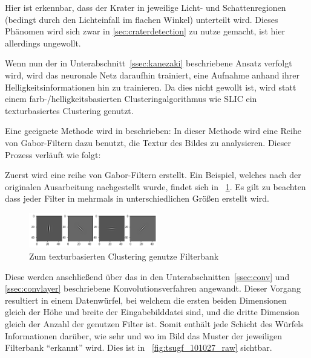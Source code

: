 Hier ist erkennbar, dass der Krater in jeweilige Licht- und Schattenregionen (bedingt durch den Lichteinfall im flachen Winkel) unterteilt wird. Dieses Phänomen wird sich zwar in \ref{sec:craterdetection} zu nutze gemacht, ist hier allerdings ungewollt.

Wenn nun der in Unterabschnitt~\ref{ssec:kanezaki} beschriebene Ansatz verfolgt wird, wird das neuronale Netz daraufhin trainiert, eine Aufnahme anhand ihrer Helligkeitsinformationen hin zu trainieren. Da dies nicht gewollt ist, wird statt einem farb-/helligkeitsbasierten Clusteringalgorithmus wie SLIC ein texturbasiertes Clustering genutzt.

Eine geeignete Methode wird in \cite{jain_91} beschrieben: In dieser Methode wird eine Reihe von Gabor-Filtern dazu benutzt, die Textur des Bildes zu analysieren. Dieser Prozess verläuft wie folgt:

Zuerst wird eine reihe von Gabor-Filtern erstellt. Ein Beispiel, welches nach der originalen Ausarbeitung nachgestellt wurde, findet sich in \figurename~\ref{fig:tsugf_filters}. Es gilt zu beachten dass jeder Filter in mehrmals in unterschiedlichen Größen erstellt wird.

\begin{figure}[h!]
	\centering
	\includegraphics[width=0.5\textwidth,keepaspectratio]{images/gen/GEN_tsugf_filterbank.png}
	\captionsetup{width=0.5\textwidth}
	\caption{Zum texturbasierten Clustering genutze Filterbank}
	\label{fig:tsugf_filters}
\end{figure}

Diese werden anschließend über das in den Unterabschnitten~\ref{ssec:conv} und \ref{ssec:convlayer} beschriebene Konvolutionsverfahren angewandt. Dieser Vorgang resultiert in einem Datenwürfel, bei welchem die ersten beiden Dimensionen gleich der Höhe und breite der Eingabebilddatei sind, und die dritte Dimension gleich der Anzahl der genutzen Filter ist. Somit enthält jede Schicht des Würfels Informationen darüber, wie sehr und wo im Bild das Muster der jeweiligen Filterbank \enquote{erkannt} wird. Dies ist in \figurename~\ref{fig:tsugf_101027_raw} sichtbar.

